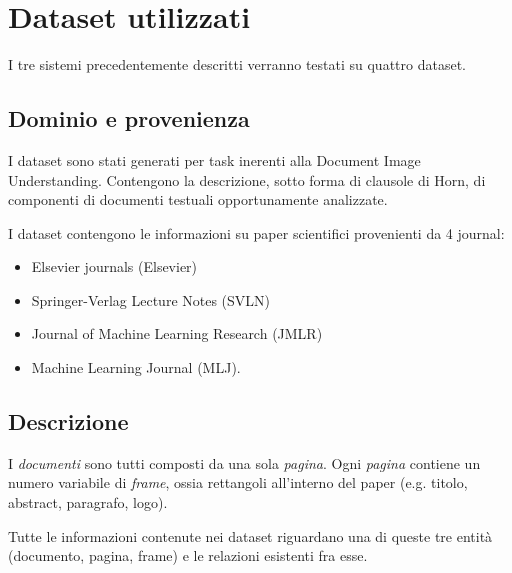 \section{Dataset utilizzati}

I tre sistemi precedentemente descritti verranno testati su quattro dataset.

\subsection{Dominio e provenienza}
I dataset sono stati generati per task inerenti alla Document Image Understanding.
Contengono la descrizione, sotto forma di clausole di Horn, di componenti di documenti testuali opportunamente analizzate.

I dataset contengono le informazioni su paper scientifici provenienti da 4 journal:
\begin{itemize}
\item Elsevier journals (Elsevier)
\item Springer-Verlag Lecture Notes (SVLN)
\item Journal of Machine Learning Research (JMLR)
\item Machine Learning Journal (MLJ).
\end{itemize}

\subsection{Descrizione}
I \emph{documenti} sono tutti composti da una sola \emph{pagina}. Ogni \emph{pagina} contiene un numero variabile di \emph{frame}, ossia rettangoli all'interno del paper (e.g. titolo, abstract, paragrafo, logo).

Tutte le informazioni contenute nei dataset riguardano una di queste tre entità (documento, pagina, frame) e le relazioni esistenti fra esse.

